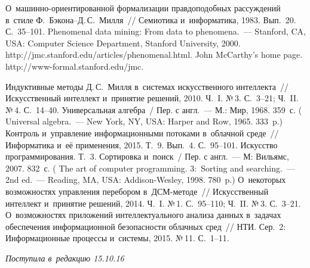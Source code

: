 \begin{multicols}{2}
{\small\frenchspacing
 {%
 \begin{thebibliography}{9}
   О~ма\-шин\-но-ори\-ен\-ти\-ро\-ван\-ной формализации 
правдоподобных рассуждений в~стиле Ф.~Бэкона--Д.\,С.~Милля~// 
Семиотика и~информатика, 1983. Вып.~20. С.~35--101.
   Phenomenal data mining: From data to phenomena.~--- 
Stanford, CA, USA: Computer Science Department, Stanford University, 2000. 
{\sf http://jmc.\linebreak stanford.edu/articles/phenomenal.html}.
   John McCarthy's home page. {\sf  
http://www-formal.stanford.edu/jmc}.
  
   Индуктивные методы Д.\,С.~Милля в~сис\-те\-мах 
искусственного интеллекта~// Искусственный интеллект и~принятие 
решений, 2010. Ч.~I. №\,3. С.~3--21; Ч.~II. №\,4. С.~14--40.
   Универсальная алгебра~/
  Пер. с англ.~--- М.: Мир, 1968. 359~с.
  (  {Universal algebra}.~---  New York, NY, USA: 
Harper and Row, 1965. 333~p.)
   Контроль 
и~управление информационными потоками в~облачной среде~// 
Информатика и~её применения, 2015. Т.~9. Вып.~4. С.~95--101.
   Искусство программирования. Т.~3. Сортировка и~поиск~/
  Пер. с англ.~--- М: Вильямс, 2007. 832~с.
( 
  {The art of computer programming. 3:~Sorting and searching}.~--- 
  2nd ed.~--- Reading, MA, USA: Addison-Wesley,  1998. 780~p.)
   О~некоторых возможностях управ\-ле\-ния 
перебором в~ДСМ-ме\-то\-де~// Искусственный интеллект и~принятие 
решений, 2014. Ч.~I. №\,1. С.~95--110; Ч.~II. №\,3. С.~3--21.
   О~возможностях приложений 
интеллектуального анализа данных в~задачах обеспечения информационной 
безопасности облачных сред~// НТИ. Сер.~2: Информационные процессы 
и~системы, 2015. №\,11. С.~1--11.
 \end{thebibliography}

 }
 }

\end{multicols}

\vspace*{-6pt}

\hfill{\small\textit{Поступила в~редакцию 15.10.16}}

